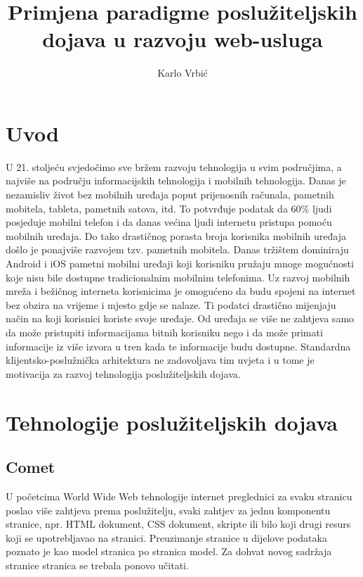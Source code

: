 \documentclass[times, utf8, zavrsni]{fer}
\begin{document}
\title{Primjena paradigme poslužiteljskih dojava u razvoju web-usluga}
\author{Karlo Vrbić}

\maketitle

\zahvala{}

\tableofcontents
\listoffigures
\lstlistoflistings

\chapter{Uvod}

U 21. stoljeću svjedočimo sve bržem razvoju tehnologija u svim područjima, a najviše na području informacijskih tehnologija i mobilnih tehnologija. Danas je nezamisliv život bez mobilnih uređaja poput prijenosnih računala, pametnih mobitela, tableta, pametnih satova, itd. To potvrđuje podatak da 60\% ljudi posjeduje mobilni telefon i da danas većina ljudi internetu pristupa pomoću mobilnih uređaja. Do tako drastičnog porasta broja korisnika mobilnih uređaja došlo je ponajviše razvojem tzv. pametnih mobitela. Danas tržištem dominiraju Android i iOS pametni mobilni uređaji koji korisniku pružaju mnoge mogućnosti koje nisu bile dostupne tradicionalnim mobilnim telefonima. Uz razvoj mobilnih mreža i bežičnog interneta korisnicima je omogućeno da budu spojeni na internet bez obzira na vrijeme i mjesto gdje se nalaze. Ti podatci drastično mijenjaju način na koji korisnici koriste svoje uređaje. Od uređaja se više ne zahtjeva samo da može pristupiti informacijama bitnih korisniku nego i da može primati informacije iz više izvora u tren kada te informacije budu dostupne. Standardna klijentsko-poslužnička arhitektura ne zadovoljava tim uvjeta i u tome je motivacija za razvoj tehnologija poslužiteljskih dojava.

\chapter{Tehnologije poslužiteljskih dojava}

\section{Comet}
U početcima World Wide Web tehnologije internet preglednici za svaku stranicu poslao više zahtjeva prema poslužitelju, svaki zahtjev za jednu komponentu stranice, npr. HTML dokument, CSS dokument, skripte ili bilo koji drugi resurs koji se upotrebljavao na stranici. Preuzimanje stranice u dijelove podataka poznato je kao model stranica po stranica model. Za dohvat novog sadržaja stranice stranica se trebala ponovo učitati.
\end{document}
